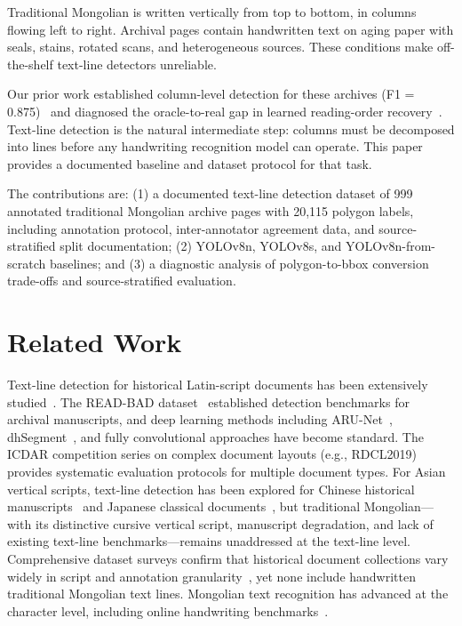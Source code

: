 \documentclass[pdflatex,sn-mathphys-num]{sn-jnl}
\begin{document}
Traditional Mongolian is written vertically from top to bottom, in columns flowing left to right. Archival pages contain handwritten text on aging paper with seals, stains, rotated scans, and heterogeneous sources. These conditions make off-the-shelf text-line detectors unreliable.

Our prior work established column-level detection for these archives (F1 = 0.875)~\cite{liang2025pilot} and diagnosed the oracle-to-real gap in learned reading-order recovery~\cite{liang2025oracle}. Text-line detection is the natural intermediate step: columns must be decomposed into lines before any handwriting recognition model can operate. This paper provides a documented baseline and dataset protocol for that task.

The contributions are: (1) a documented text-line detection dataset of 999 annotated traditional Mongolian archive pages with 20,115 polygon labels, including annotation protocol, inter-annotator agreement data, and source-stratified split documentation; (2) YOLOv8n, YOLOv8s, and YOLOv8n-from-scratch baselines; and (3) a diagnostic analysis of polygon-to-bbox conversion trade-offs and source-stratified evaluation.

\section{Related Work}
Text-line detection for historical Latin-script documents has been extensively studied~\cite{likforman2007textline}. The READ-BAD dataset~\cite{gruning2017readbad} established detection benchmarks for archival manuscripts, and deep learning methods including ARU-Net~\cite{gruning2019arunet}, dhSegment~\cite{oliveira2018dhsegment}, and fully convolutional approaches have become standard. The ICDAR competition series on complex document layouts (e.g., RDCL2019)~\cite{clausner2019icdar} provides systematic evaluation protocols for multiple document types. For Asian vertical scripts, text-line detection has been explored for Chinese historical manuscripts~\cite{xu2020chinese} and Japanese classical documents~\cite{clanuwat2018bells}, but traditional Mongolian---with its distinctive cursive vertical script, manuscript degradation, and lack of existing text-line benchmarks---remains unaddressed at the text-line level. Comprehensive dataset surveys confirm that historical document collections vary widely in script and annotation granularity~\cite{nikolaidou2022survey}, yet none include handwritten traditional Mongolian text lines. Mongolian text recognition has advanced at the character level, including online handwriting benchmarks~\cite{pan2023molhw}.
\end{document}
